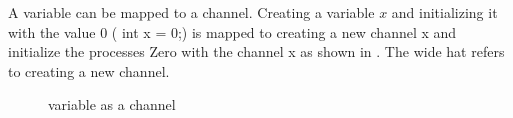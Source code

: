 A variable can be mapped to a channel. Creating a variable $x$ and initializing it with the value $0$ ( int x = 0;) is mapped to creating a new channel x and initialize the processes Zero with the channel x
as shown in . The wide hat refers to creating a new channel.
\begin{figure}[H]%
\centering
{}%
\hspace{1em}%
%
\caption{variable as a channel}
\label{tra_var}%
\end{figure}

